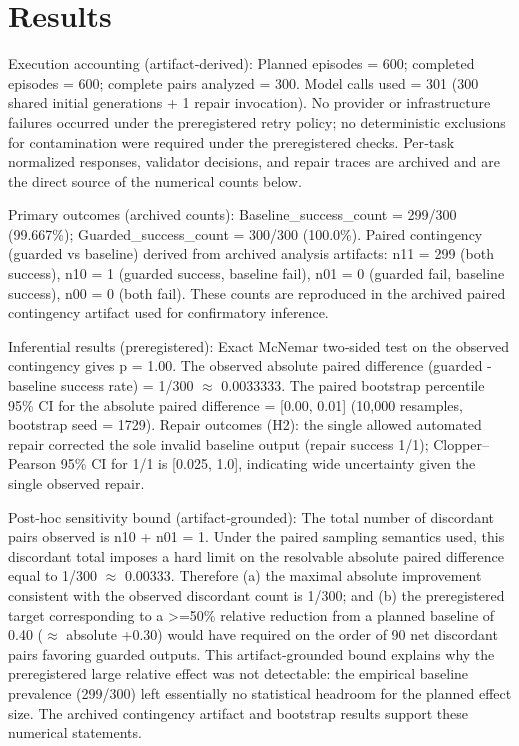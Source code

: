 \documentclass[conference]{IEEEtran}
\begin{document}
\section{Results}
Execution accounting (artifact‑derived): Planned episodes = 600; completed episodes = 600; complete pairs analyzed = 300. Model calls used = 301 (300 shared initial generations + 1 repair invocation). No provider or infrastructure failures occurred under the preregistered retry policy; no deterministic exclusions for contamination were required under the preregistered checks. Per‑task normalized responses, validator decisions, and repair traces are archived and are the direct source of the numerical counts below.

Primary outcomes (archived counts): Baseline\_success\_count = 299/300 (99.667\%); Guarded\_success\_count = 300/300 (100.0\%). Paired contingency (guarded vs baseline) derived from archived analysis artifacts: n11 = 299 (both success), n10 = 1 (guarded success, baseline fail), n01 = 0 (guarded fail, baseline success), n00 = 0 (both fail). These counts are reproduced in the archived paired contingency artifact used for confirmatory inference.

Inferential results (preregistered): Exact McNemar two‑sided test on the observed contingency gives p = 1.00. The observed absolute paired difference (guarded - baseline success rate) = 1/300 \ensuremath{\approx} 0.0033333. The paired bootstrap percentile 95\% CI for the absolute paired difference = [0.00, 0.01] (10,000 resamples, bootstrap seed = 1729). Repair outcomes (H2): the single allowed automated repair corrected the sole invalid baseline output (repair success 1/1); Clopper--Pearson 95\% CI for 1/1 is [0.025, 1.0], indicating wide uncertainty given the single observed repair.

Post‑hoc sensitivity bound (artifact‑grounded): The total number of discordant pairs observed is n10 + n01 = 1. Under the paired sampling semantics used, this discordant total imposes a hard limit on the resolvable absolute paired difference equal to 1/300 \ensuremath{\approx} 0.00333. Therefore (a) the maximal absolute improvement consistent with the observed discordant count is 1/300; and (b) the preregistered target corresponding to a >=50\% relative reduction from a planned baseline of 0.40 (\ensuremath{\approx} absolute +0.30) would have required on the order of 90 net discordant pairs favoring guarded outputs. This artifact‑grounded bound explains why the preregistered large relative effect was not detectable: the empirical baseline prevalence (299/300) left essentially no statistical headroom for the planned effect size. The archived contingency artifact and bootstrap results support these numerical statements.
\end{document}
